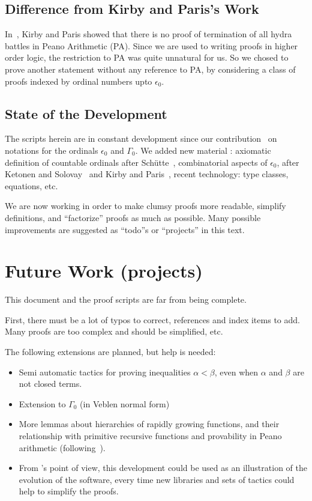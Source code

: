 
\subsection*{Difference from Kirby and Paris's Work}
In~\cite{KP82}, Kirby and Paris showed  that there is no proof of termination of all hydra battles in Peano Arithmetic (PA).
Since we are used to writing proofs in higher order logic, the restriction to PA was quite unnatural for us. So we chosed to prove another statement without any reference to PA, by considering a class of proofs indexed by ordinal numbers upto $\epsilon_0$.

\subsection*{State of the Development}
The \coq{} scripts herein are in constant development since our contribution~\cite{CantorContrib} on  notations for the ordinals $\epsilon_0$ and $\Gamma_0$.
We added new material : axiomatic definition of countable ordinals after Schütte~\cite{schutte}, combinatorial aspects of $\epsilon_0$, after Ketonen and Solovay~\cite{KS81} and Kirby and Paris~\cite{KP82}, recent \coq{} technology: type classes, equations, etc.

We are now working in order to make clumsy proofs more readable, simplify definitions, and ``factorize'' proofs as much as possible. 
Many possible improvements are suggested as ``todo''s or ``projects'' in this text.


\section*{Future Work (projects)}

This document and the proof scripts are far from being complete.

First, there must be a lot of typos to correct, references and index items to add. Many proofs are too complex and should be simplified, etc.

The following extensions are planned, but help is needed:

\begin{itemize}
\item Semi automatic tactics for proving inequalities $\alpha < \beta$, even when $\alpha$ and $\beta$ are not closed terms.
\item Extension to $\Gamma_0$ (in Veblen normal form)
\item More lemmas about hierarchies of rapidly growing functions, and their relationship 
    with primitive recursive functions and provability in Peano arithmetic 
(following~\cite{KS81, KP82}).
\item From \coq's point of view, this development could be used as an illustration of the evolution of the software, every time new libraries and sets of tactics could help to simplify the proofs.
\end{itemize}

